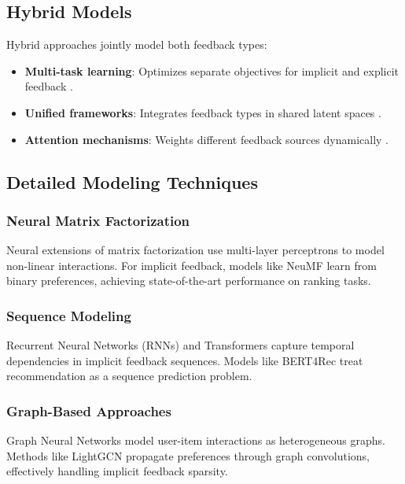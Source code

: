 \subsection{Hybrid Models}

Hybrid approaches jointly model both feedback types:
\begin{itemize}
    \item \textbf{Multi-task learning}: Optimizes separate objectives for implicit and explicit feedback \cite{ma2011learning}.
    \item \textbf{Unified frameworks}: Integrates feedback types in shared latent spaces \cite{lian2017cccfnet}.
    \item \textbf{Attention mechanisms}: Weights different feedback sources dynamically \cite{chen2017attentive}.
\end{itemize}

\subsection{Detailed Modeling Techniques}

\subsubsection{Neural Matrix Factorization}

Neural extensions of matrix factorization use multi-layer perceptrons to model non-linear interactions. For implicit feedback, models like NeuMF \cite{he2017neural} learn from binary preferences, achieving state-of-the-art performance on ranking tasks.

\subsubsection{Sequence Modeling}

Recurrent Neural Networks (RNNs) and Transformers capture temporal dependencies in implicit feedback sequences. Models like BERT4Rec \cite{sun2019bert4rec} treat recommendation as a sequence prediction problem.

\subsubsection{Graph-Based Approaches}

Graph Neural Networks model user-item interactions as heterogeneous graphs. Methods like LightGCN \cite{he2020lightgcn} propagate preferences through graph convolutions, effectively handling implicit feedback sparsity.

